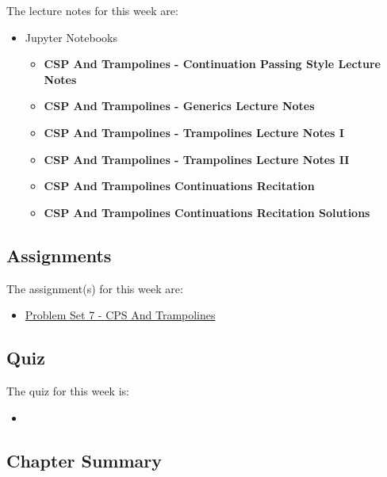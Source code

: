 \noindent The lecture notes for this week are:

\begin{itemize}
    \item Jupyter Notebooks
    \begin{itemize}
        \item \textbf{CSP And Trampolines - Continuation Passing Style Lecture Notes}
        \item \textbf{CSP And Trampolines - Generics Lecture Notes}
        \item \textbf{CSP And Trampolines - Trampolines Lecture Notes I}
        \item \textbf{CSP And Trampolines - Trampolines Lecture Notes II}
        \item \textbf{CSP And Trampolines Continuations Recitation}
        \item \textbf{CSP And Trampolines Continuations Recitation Solutions}
    \end{itemize}
\end{itemize}

\subsection{Assignments}

The assignment(s) for this week are:

\begin{itemize}
    \item \href{https://github.com/QuantumCompiler/CU/tree/main/CSPB%203155%20-%20Principles%20Of%20Programming%20Languages/Assignments/Problem%20Sets/Problem%20Set%207%20-%20CPS%20And%20Trampolines}{Problem Set 7 - CPS And Trampolines}
\end{itemize}

\subsection{Quiz}

The quiz for this week is:

\begin{itemize}
    \item {}
\end{itemize}

\newpage

\subsection{Chapter Summary}

